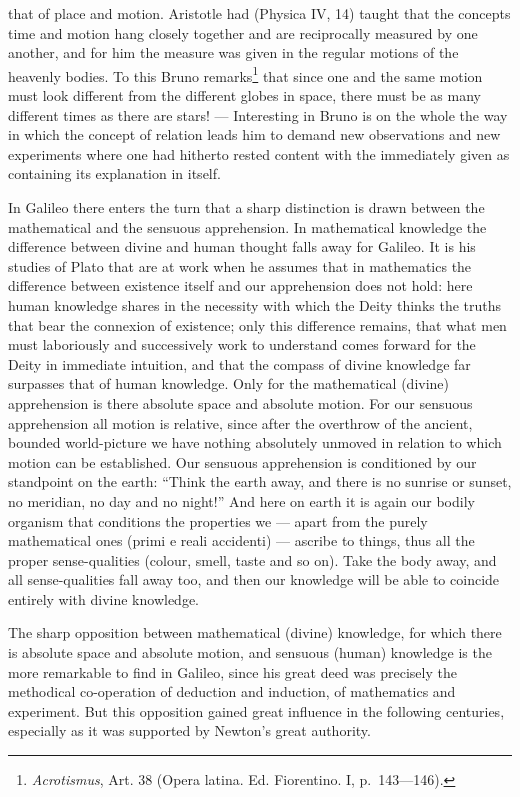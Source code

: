 \documentclass[12pt]{article}
\newcommand{\opage}[1]{\marginnote{\footnotesize\textit{[#1]}}}
\begin{document}
that of place and motion. Aristotle had (Physica IV, 14) taught that the
concepts time and motion hang closely together and are reciprocally measured
by one another, and for him the measure was given in the regular motions of
the heavenly bodies. To this Bruno remarks\footnote{\textit{Acrotismus},
Art. 38 (Opera latina. Ed. Fiorentino. I, p.~143---146).} that since one and
the same motion must look different from the different globes in space,
there must be as many different times as there are stars! --- Interesting in
Bruno is on the whole the way in which the concept of relation leads him to
demand new observations and new experiments where one had hitherto rested
content with the immediately given as containing its explanation in itself.

In Galileo there enters the turn that a sharp distinction is drawn between
the mathematical and the sensuous apprehension. In mathematical knowledge
the difference between divine and human thought falls away for Galileo. It
is his studies of Plato that are at work when he assumes that in mathematics
the difference between existence itself and our apprehension does not hold:
here human knowledge shares in the necessity with which the Deity \opage{65}thinks the
truths that bear the connexion of existence; only this difference remains,
that what men must laboriously and successively work to understand comes
forward for the Deity in immediate intuition, and that the compass of divine
knowledge far surpasses that of human knowledge. Only for the mathematical
(divine) apprehension is there absolute space and absolute motion. For our
sensuous apprehension all motion is relative, since after the overthrow of
the ancient, bounded world-picture we have nothing absolutely unmoved in
relation to which motion can be established. Our sensuous apprehension is
conditioned by our standpoint on the earth: ``Think the earth away, and
there is no sunrise or sunset, no meridian, no day and no night!'' And here
on earth it is again our bodily organism that conditions the properties we
--- apart from the purely mathematical ones (primi e reali accidenti) ---
ascribe to things, thus all the proper sense-qualities (colour, smell, taste
and so on). Take the body away, and all sense-qualities fall away too, and
then our knowledge will be able to coincide entirely with divine knowledge.

The sharp opposition between mathematical (divine) knowledge, for which
there is absolute space and absolute motion, and sensuous (human) knowledge
is the more remarkable to find in Galileo, since his great deed was
precisely the methodical co-operation of deduction and induction, of
mathematics and experiment. But this opposition gained great influence in
the following centuries, especially as it was supported by Newton's great
authority.
\end{document}
